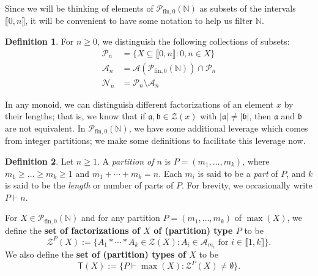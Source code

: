 \documentclass{report}
\renewcommand{\aa}{\mathfrak{a}}
\newcommand{\bb}{\mathfrak{b}}
\newcommand{\NN}{\mathbb{N}}
\renewcommand{\P}{\mathcal{P}}
\newcommand{\Z}{\mathcal{Z}}
\newcommand{\llb}{\llbracket}
\newcommand{\rrb}{\rrbracket}
\newcommand{\fin}{\textrm{fin}}
\renewcommand{\:}{\text{:}}
\newcommand{\PN}{{\P_{\fin,0}(\NN)}}
\theoremstyle{definition}
\newtheorem{defn}{Definition}[section]
\begin{document}
Since we will be thinking of elements of $\PN$ as subsets of the intervals $\llb 0,n \rrb$, it will be convenient to have some notation to help us filter $\NN$.


\begin{defn} \label{def:filtration}
For $n\ge 0$, we distinguish the following collections of subsets:
\begin{align*}
 \P_n &= \{ X \subseteq \llb 0,n \rrb : 0,n\in X \} \\
\mathcal{A}_n &= \mathcal{A}(\PN) \cap \P_n  \\
\mathcal{N}_n &= \P_n \setminus \mathcal{A}_n 
\end{align*}
\end{defn}



In any monoid, we can distinguish different factorizations of an element $x$ by their lengths; that is, we know that if $\aa,\bb\in \Z(x)$ with $|\aa| \neq |\bb|$, then $\aa$ and $\bb$ are not equivalent.
In $\PN$, we have some additional leverage which comes from integer partitions; we make some definitions to facilitate this leverage now.

\begin{defn}
Let $n\ge 1$. A \textit{partition of $n$} is $P = (m_1,\dots, m_k)$, where $m_1 \ge \dots \ge m_k \ge 1$ and $m_1+\cdots + m_k = n$. 
Each $m_i$ is said to be a \textit{part} of $P$, and $k$ is said to be the \textit{length} or number of parts of $P$.
For brevity, we occasionally write $P \vdash n$.

For $X \in \PN$ and for any partition $P = (m_1,\dots, m_k)$ of $\max(X)$, we define the \textbf{set of factorizations of $X$ of (partition) type $P$} to be
\[ \Z^P(X) := \{ A_1*\cdots * A_k \in \Z(X) : A_i \in \mathcal{A}_{m_i} \textrm{ for } i\in \llb 1,k \rrb \}. \]
We also define the \textbf{set of (partition) types of $X$} to be
\[ \mathsf{T}(X) :=  \{ P \vdash \max(X) : \Z^P(X) \neq \emptyset \}. \]
\end{defn}
\end{document}
